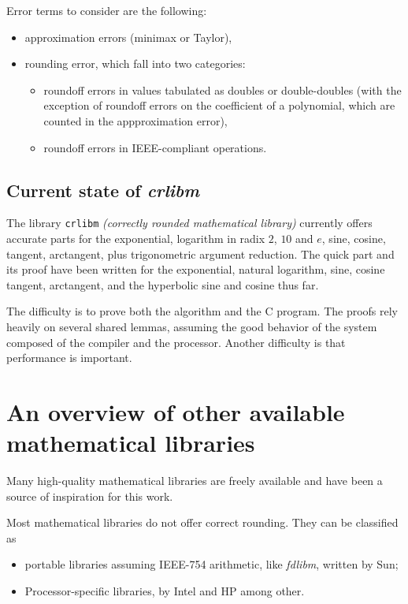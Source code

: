 Error terms to consider are the following:
\begin{itemize}
\item approximation errors  (minimax or Taylor),
\item rounding error, which fall into two categories:
  \begin{itemize}
  \item roundoff errors in values tabulated as doubles or
    double-doubles (with the exception of roundoff errors on the coefficient
    of a polynomial, which are counted in the appproximation error),
  \item roundoff errors in IEEE-compliant operations.
  \end{itemize}
\end{itemize}




\subsection{Current state of \emph{crlibm}}

The library \texttt{crlibm} \emph{(correctly rounded mathematical
  library)} currently offers accurate parts for the exponential,
logarithm in radix $2$, $10$ and $e$, sine, cosine, tangent,
arctangent, plus trigonometric argument reduction. The quick part and
its proof have been written for the exponential, natural logarithm,
sine, cosine tangent, arctangent, and the hyperbolic sine and cosine
thus far.

The difficulty is to prove both the algorithm and the C program.
The proofs rely heavily on several shared lemmas, assuming the good
behavior of the system composed of the compiler and the processor.
Another difficulty is that performance is important.



\section{An overview of other  available mathematical libraries\label{section:lib-overview}}

Many high-quality mathematical libraries are freely available and have
been a source of inspiration for this work.

Most mathematical libraries do not offer correct rounding. They can be classified as 
\begin{itemize}
\item portable libraries  assuming IEEE-754
  arithmetic, like \emph{fdlibm}, written by Sun\cite{FDLIBMweb};
\item  Processor-specific libraries, by
  Intel\cite{HarKubStoTan99,IntelOpenSource} and
  HP\cite{Markstein2000,Markstein2001} among other.
\end{itemize}


